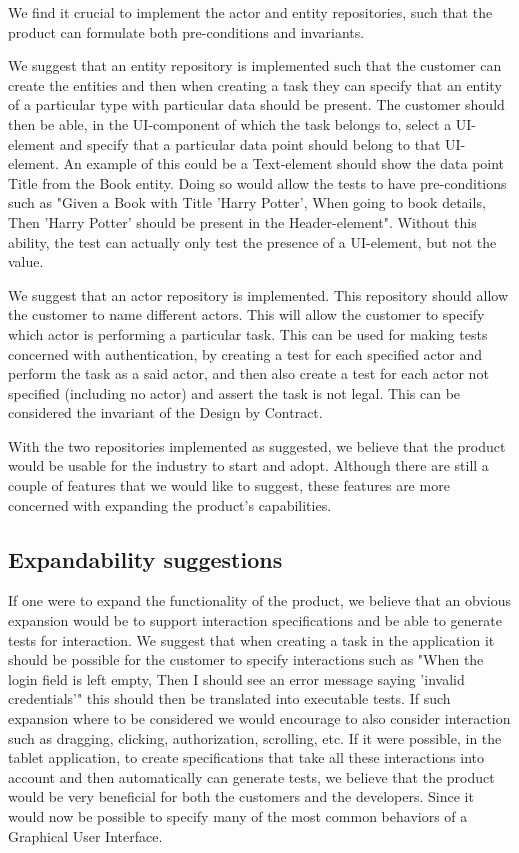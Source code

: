 We find it crucial to implement the actor and entity repositories, such that the product can formulate both pre-conditions and invariants.

We suggest that an entity repository is implemented such that the customer can create the entities and then when creating a task they can specify that an entity of a particular type with particular data should be present.
The customer should then be able, in the UI-component of which the task belongs to, select a UI-element and specify that a particular data point should belong to that UI-element.
An example of this could be a Text-element should show the data point Title from the Book entity.
Doing so would allow the tests to have pre-conditions such as "Given a Book with Title 'Harry Potter', When going to book details, Then 'Harry Potter' should be present in the Header-element".
Without this ability, the test can actually only test the presence of a UI-element, but not the value.

We suggest that an actor repository is implemented.
This repository should allow the customer to name different actors.
This will allow the customer to specify which actor is performing a particular task.
This can be used for making tests concerned with authentication, by creating a test for each specified actor and perform the task as a said actor, and then also create a test for each actor not specified (including no actor) and assert the task is not legal.
This can be considered the invariant of the Design by Contract.

With the two repositories implemented as suggested, we believe that the product would be usable for the industry to start and adopt.
Although there are still a couple of features that we would like to suggest, these features are more concerned with expanding the product's capabilities.

\subsection{Expandability suggestions}
If one were to expand the functionality of the product, we believe that an obvious expansion would be to support interaction specifications and be able to generate tests for interaction.
We suggest that when creating a task in the application it should be possible for the customer to specify interactions such as "When the login field is left empty, Then I should see an error message saying 'invalid credentials'" this should then be translated into executable tests. 
If such expansion where to be considered we would encourage to also consider interaction such as dragging, clicking, authorization, scrolling, etc.
If it were possible, in the tablet application, to create specifications that take all these interactions into account and then automatically can generate tests, we believe that the product would be very beneficial for both the customers and the developers.
Since it would now be possible to specify many of the most common behaviors of a Graphical User Interface.

